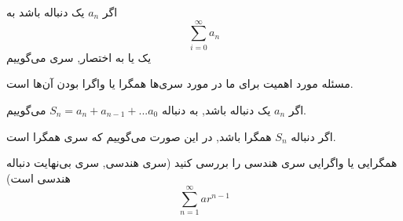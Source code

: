 
\begin{DEFINITION}
    اگر 
    $a_n$
    یک دنباله باشد به
    \[\sum_{i=0}^{\infty}a_n\]
    یک 
    یا به اختصار, سری می‌گوییم
\end{DEFINITION}
مسئله مورد اهمیت برای ما در مورد سری‌ها همگرا یا واگرا بودن آن‌ها است.
\begin{DEFINITION}
    اگر
    $a_n$
    یک دنباله باشد,
    به دنباله
    $S_n=a_n+a_{n-1}+...a_0$
    می‌گوییم.
\end{DEFINITION}


\begin{THEOREM}
    اگر دنباله 
    $S_n$
    همگرا باشد, در این صورت می‌گوییم که سری همگرا است.
\end{THEOREM}

\begin{PROBLEM}
    همگرایی یا واگرایی سری هندسی را بررسی کنید
    (سری هندسی, سری بی‌نهایت دنباله هندسی است)
    \[\sum_{n=1}^{\infty}ar^{n-1}\]
\end{PROBLEM}

